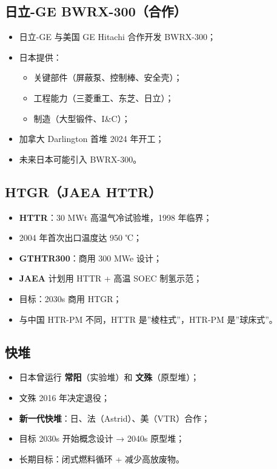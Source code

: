 \documentclass[
  UTF8,
  scheme=plain,
  fontsize=10pt,
  openany
]{ctexbook}
\begin{document}
\subsection{日立-GE
BWRX-300（合作）}\label{ux65e5ux7acb-ge-bwrx-300ux5408ux4f5c}

\begin{itemize}
\tightlist
\item
  日立-GE 与美国 GE Hitachi 合作开发 BWRX-300；
\item
  日本提供：

  \begin{itemize}
  \tightlist
  \item
    关键部件（屏蔽泵、控制棒、安全壳）；
  \item
    工程能力（三菱重工、东芝、日立）；
  \item
    制造（大型锻件、I\&C）；
  \end{itemize}
\item
  加拿大 Darlington 首堆 2024 年开工；
\item
  未来日本可能引入 BWRX-300。
\end{itemize}

\subsection{HTGR（JAEA HTTR）}\label{htgrjaea-httr}

\begin{itemize}
\tightlist
\item
  \textbf{HTTR}：30 MWt 高温气冷试验堆，1998 年临界；
\item
  2004 年首次出口温度达 950 ℃；
\item
  \textbf{GTHTR300}：商用 300 MWe 设计；
\item
  \textbf{JAEA} 计划用 HTTR + 高温 SOEC 制氢示范；
\item
  目标：2030s 商用 HTGR；
\item
  与中国 HTR-PM 不同，HTTR 是''棱柱式''，HTR-PM 是''球床式''。
\end{itemize}

\subsection{快堆}\label{ux5febux5806}

\begin{itemize}
\tightlist
\item
  日本曾运行 \textbf{常阳}（实验堆）和 \textbf{文殊}（原型堆）；
\item
  文殊 2016 年决定退役；
\item
  \textbf{新一代快堆}：日、法（Astrid）、美（VTR）合作；
\item
  目标 2030s 开始概念设计 → 2040s 原型堆；
\item
  长期目标：闭式燃料循环 + 减少高放废物。
\end{itemize}
\end{document}
